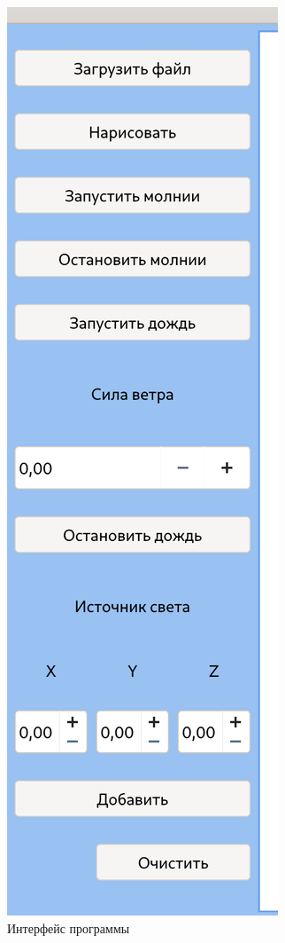 \begin{figure}[H]
	\centering
	\includegraphics[scale=0.3]{include/inerface.png}
	\caption{Интерфейс программы}
	\label{img:interface}
\end{figure} 

